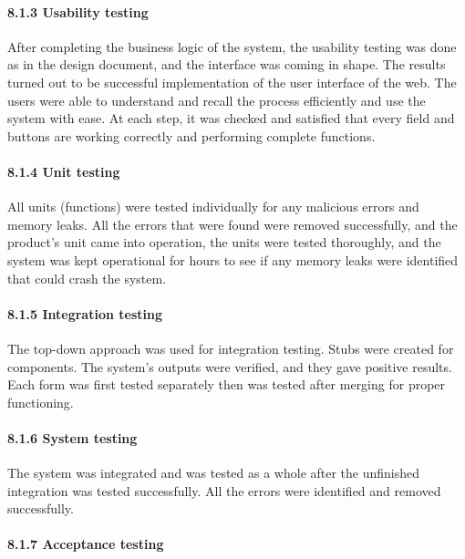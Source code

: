 \documentclass{article} %
\begin{document}
\noindent 
\paragraph{8.1.3 Usability testing}

\noindent After completing the business logic of the system, the usability testing was done as in the design document, and the interface was coming in shape. The results turned out to be successful implementation of the user interface of the web. The users were able to understand and recall the process efficiently and use the system with ease. At each step, it was checked and satisfied that every field and buttons are working correctly and performing complete functions.

\noindent 
\paragraph{8.1.4 Unit testing}

\noindent All units (functions) were tested individually for any malicious errors and memory leaks. All the errors that were found were removed successfully, and the product's unit came into operation, the units were tested thoroughly, and the system was kept operational for hours to see if any memory leaks were identified that could crash the system.

\noindent 
\paragraph{8.1.5 Integration testing}

\noindent The top-down approach was used for integration testing. Stubs were created for components. The system's outputs were verified, and they gave positive results. Each form was first tested separately then was tested after merging for proper functioning.

\noindent 
\paragraph{8.1.6 System testing}

\noindent The system was integrated and was tested as a whole after the unfinished integration was tested successfully. All the errors were identified and removed successfully.

\noindent 
\paragraph{8.1.7 Acceptance testing}
\end{document}
